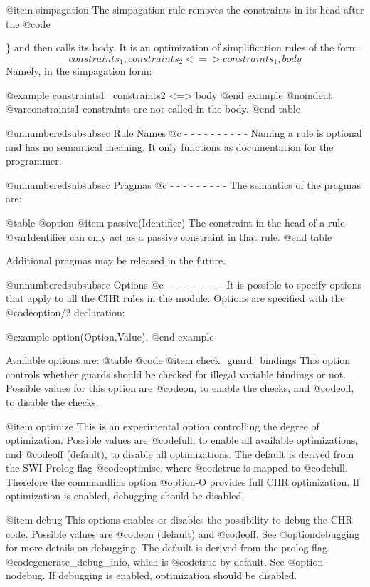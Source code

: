 @item simpagation
The simpagation rule removes the constraints in its head after the
@code{\} and then calls its body. It is an optimization of
simplification rules of the form: \[constraints_1, constraints_2 <=>
constraints_1, body \] Namely, in the simpagation form: 

@example
constraints1 \ constraints2 <=> body
@end example
@noindent
@var{constraints1}
constraints are not called in the body.
@end table

@unnumberedsubsubsec Rule Names
@c - - - - - - - - - - 
Naming a rule is optional and has no semantical meaning. It only functions
as documentation for the programmer.

@unnumberedsubsubsec Pragmas
@c - - - - - - - - -
The semantics of the pragmas are:

@table @option
@item passive(Identifier)
The constraint in the head of a rule @var{Identifier} can only act as a
passive constraint in that rule.
@end table

Additional pragmas may be released in the future.

@unnumberedsubsubsec Options
@c - - - - - - - - -
It is possible to specify options that apply to all the CHR rules in the module.
Options are specified with the @code{option/2} declaration:

@example
                option(Option,Value).
@end example

Available options are:
@table @code
        @item check_guard_bindings
This option controls whether guards should be checked for illegal
variable bindings or not. Possible values for this option are
@code{on}, to enable the checks, and @code{off}, to disable the
checks.

        @item optimize
This is an experimental option controlling the degree of optimization.
Possible values are @code{full}, to enable all available
optimizations, and @code{off} (default), to disable all optimizations.  
The default is derived from the SWI-Prolog flag @code{optimise}, where
@code{true} is mapped to @code{full}.  Therefore the commandline
option @option{-O} provides full CHR optimization.
If optimization is enabled, debugging should be disabled.

	@item debug
This options enables or disables the possibility to debug the CHR code.
Possible values are @code{on} (default) and @code{off}. See
@option{debugging} for more details on debugging.  The default is
derived from the prolog flag @code{generate_debug_info}, which
is @code{true} by default.  See @option{-nodebug}.
If debugging is enabled, optimization should be disabled.

}
